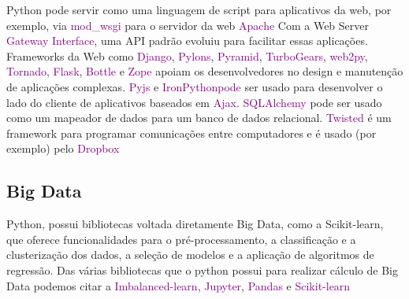    Python pode servir como uma linguagem de script para aplicativos da web, por exemplo, via \textcolor{purple}{mod\_wsgi} para o servidor da web \textcolor{purple}{Apache} Com a Web Server \textcolor{purple}{Gateway Interface}, uma API padrão evoluiu para facilitar essas aplicações. Frameworks da Web como \textcolor{purple}{Django}, \textcolor{purple}{Pylons}, \textcolor{purple}{Pyramid}, \textcolor{purple}{TurboGears}, \textcolor{purple}{web2py}, \textcolor{purple}{Tornado}, \textcolor{purple}{Flask}, \textcolor{purple}{Bottle} e \textcolor{purple}{Zope} apoiam os desenvolvedores no design e manutenção de aplicações complexas. \textcolor{purple}{Pyjs} e \textcolor{purple}{IronPythonpode} ser usado para desenvolver o lado do cliente de aplicativos baseados em \textcolor{purple}{Ajax}. \textcolor{purple}{SQLAlchemy} pode ser usado como um mapeador de dados para um banco de dados relacional. \textcolor{purple}{Twisted}  é um framework para programar comunicações entre computadores e é usado (por exemplo) pelo \textcolor{purple}{Dropbox} \cite{Int03}

        \subsection{ Big Data}
        Python, possui bibliotecas voltada diretamente Big Data, como a Scikit-learn, que oferece funcionalidades para o pré-processamento, a classificação e a clusterização dos dados, a seleção de modelos e a aplicação de algoritmos de regressão.
        Das várias bibliotecas que o python possui para realizar cálculo de Big Data podemos citar a \textcolor{purple}{Imbalanced-learn}, \textcolor{purple}{Jupyter}, \textcolor{purple}{Pandas} e \textcolor{purple}{Scikit-learn} 
        
